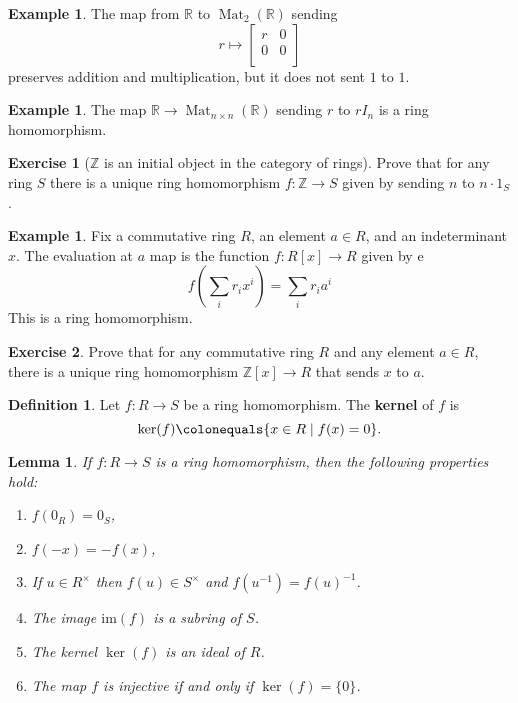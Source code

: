 \documentclass[12pt]{report}
\newtheorem{lemma}[theorem]{Lemma}
\numberwithin{equation}{section}
\numberwithin{theorem}{chapter}
\theoremstyle{definition}
\newtheorem{definition}[theorem]{Definition}
\newtheorem{example}[theorem]{Example}
\newtheorem{exercise}{Exercise}
\newtheorem*{basic properties}{Basic Properties}
\newtheorem*{Important Remark}{Important Remark}
\newcommand{\df}[1]{{\bf #1}\index{#1}}
\renewcommand{\ker}{\operatorname{ker}}
\DeclareMathOperator{\Mat}{Mat}
\begin{document}
\begin{example} 
The map from $\mathbb{R}$ to $\Mat_{2}(\mathbb{R})$ sending 
$$r \mapsto \begin{bmatrix} r & 0 \\0  & 0 \\ \end{bmatrix}$$
preserves addition and multiplication, but it does not sent $1$ to $1$.  	
\end{example}


  
\begin{example} 
The map $\mathbb{R}  \to \Mat_{n \times n}(\mathbb{R})$ sending $r$ to $rI_n$ is a ring homomorphism. 	
\end{example}





\begin{exercise}[$\mathbb{Z}$ is an initial object in the category of rings] 
 Prove that for any ring $S$ there is a unique ring homomorphism $f: \mathbb{Z} \to S$ given by sending $n$ to $n \cdot 1_S$. 	
\end{exercise}
  
  
\begin{example} 
Fix a commutative ring $R$, an element $a \in R$, and an indeterminant $x$. The evaluation at $a$ map is the function $f\!: R[x] \to R$ given by e
    $$f \left( \sum_i r_i x^i \right) = \sum_i r_i a^i$$ 
    This is a ring homomorphism.
\end{example}
  

\begin{exercise} 
Prove that for any commutative ring $R$ and any element $a \in R$, there is a unique ring homomorphism $\mathbb{Z}[x] \to R$ that sends $x$ to $a$.   	
\end{exercise}


\begin{definition}
	Let $f\!: R \longrightarrow S$ be a ring homomorphism. The \df{kernel} of $f$ is
	$$\ker(f) \colonequals \{ x \in R \mid f(x) = 0 \}.$$
\end{definition}


\begin{lemma}\label{ring hom properties}
If $f\!: R \to S$ is a ring homomorphism, then the following properties hold:
\begin{enumerate}[itemsep=0.1em]
\item $f(0_R) = 0_S$,
\item $f(-x)=-f(x)$, 
\item If $u\in R^\times$ then $f(u) \in S^\times$ and $f(u^{-1})=f(u)^{-1}$.
\item The image $\mathrm{im}(f)$ is a subring of $S$.
\item The kernel $\ker(f)$ is an ideal of $R$.
\item The map $f$ is injective if and only if $\ker(f) = \{0\}$. 
\end{enumerate}
\end{lemma}
\end{document}
